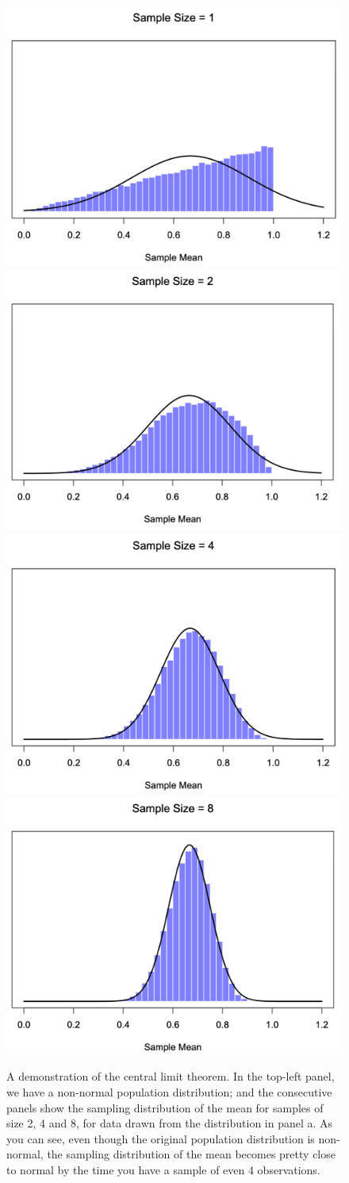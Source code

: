 \documentclass[
]{book}
\theoremstyle{definition}
\theoremstyle{definition}
\theoremstyle{definition}
\theoremstyle{definition}
\theoremstyle{remark}
\begin{document}
\begin{figure}

{\centering \includegraphics[width=0.45\linewidth]{resources/image/cltDemo-a} \includegraphics[width=0.45\linewidth]{resources/image/cltDemo-b} \includegraphics[width=0.45\linewidth]{resources/image/cltDemo-c} \includegraphics[width=0.45\linewidth]{resources/image/cltDemo-d} 

}

\caption{A demonstration of the central limit theorem. In the top-left panel, we have a non-normal population distribution; and the consecutive panels show the sampling distribution of the mean for samples of size 2, 4 and 8, for data drawn from the distribution in panel a. As you can see, even though the original population distribution is non-normal, the sampling distribution of the mean becomes pretty close to normal by the time you have a sample of even 4 observations. }\label{fig:cltdemo}
\end{figure}
\end{document}
